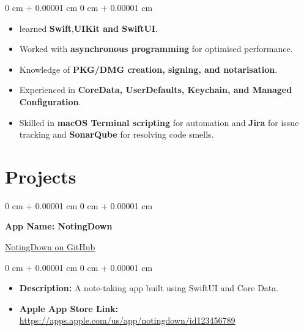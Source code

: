 \documentclass[10pt, letterpaper]{article}
\newenvironment{highlights}{
    \begin{itemize}[
        topsep=0.10 cm,
        parsep=0.10 cm,
        partopsep=0pt,
        itemsep=0pt,
        leftmargin=0 cm + 10pt
    ]
}{
    \end{itemize}
} %
\newenvironment{onecolentry}{
    \begin{adjustwidth}{
        0 cm + 0.00001 cm
    }{
        0 cm + 0.00001 cm
    }
}{
    \end{adjustwidth}
} %
\newenvironment{twocolentry}[2][]{
    \onecolentry
    \def\secondColumn{#2}
    \setcolumnwidth{\fill, 4.5 cm}
    \begin{paracol}{2}
}{
    \switchcolumn \raggedleft \secondColumn
    \end{paracol}
    \endonecolentry
} %
\begin{document}
        \vspace{0.10 cm}
        \begin{onecolentry}
            \begin{highlights}
                \item learned \textbf{Swift},\textbf{UIKit and SwiftUI}.
                \item Worked with \textbf{asynchronous programming} for optimised performance.
                \item Knowledge of \textbf{PKG/DMG creation, signing, and notarisation}.
                \item Experienced in \textbf{CoreData, UserDefaults, Keychain, and Managed Configuration}.
                \item Skilled in \textbf{macOS Terminal scripting} for automation and \textbf{Jira} for issue tracking and \textbf{SonarQube} for resolving code smells.
            \end{highlights}
        \end{onecolentry}

        \vspace{0.2 cm}

    \section{Projects}

    \vspace{0.2 cm}

    \begin{twocolentry}{
        \href{https://github.com/sachin6174/NotingDown}{NotingDown on GitHub}
    }
        \textbf{App Name: NotingDown}
    \end{twocolentry}

    \vspace{0.10 cm}
    \begin{onecolentry}
        \begin{highlights}
            \item \textbf{Description:} A note-taking app built using SwiftUI and Core Data.
            \item \textbf{Apple App Store Link:} \href{https://apps.apple.com/us/app/notingdown/id123456789}{https://apps.apple.com/us/app/notingdown/id123456789}
        \end{highlights}
    \end{onecolentry}

    \vspace{0.2 cm}
\end{document}
